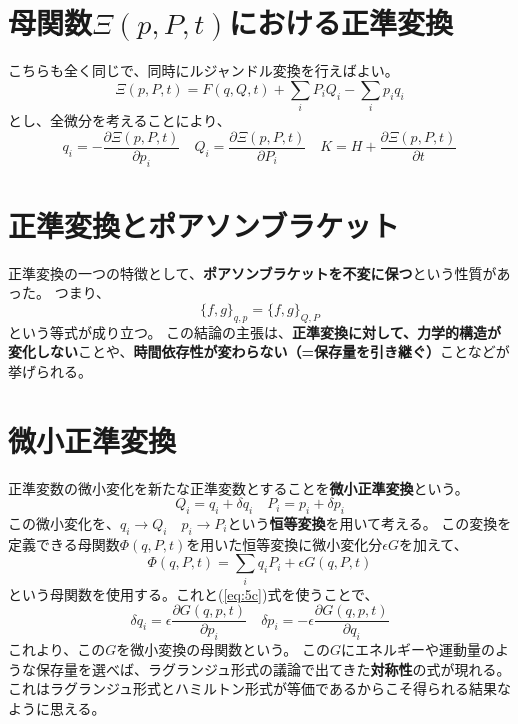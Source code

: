 \documentclass[a4paper]{jsreport}
\begin{document}
        \section{母関数$\Xi(p, P, t)$における正準変換}
            こちらも全く同じで、同時にルジャンドル変換を行えばよい。
            \begin{equation}
                \Xi(p, P, t) = F(q, Q, t) + \sum_{i} P_i Q_i - \sum_{i} p_i q_i
            \end{equation}
            とし、全微分を考えることにより、
            \begin{equation} \label{eq:5d}
                q_i = - \frac{\partial \Xi(p, P, t)}{\partial p_i} \quad Q_i = \frac{\partial \Xi(p, P, t)}{\partial P_i} \quad K = H + \frac{\partial \Xi(p, P, t)}{\partial t}
            \end{equation}
        
        \section{正準変換とポアソンブラケット}
            正準変換の一つの特徴として、\textbf{ポアソンブラケットを不変に保つ}という性質があった。
            つまり、
            \begin{equation}
                \{ f, g \}_{q, p} = \{ f, g \}_{Q, P}
            \end{equation}
            という等式が成り立つ。
            この結論の主張は、\textbf{正準変換に対して、力学的構造が変化しない}ことや、\textbf{時間依存性が変わらない（=保存量を引き継ぐ）}ことなどが挙げられる。

        \section{微小正準変換}
            正準変数の微小変化を新たな正準変数とすることを\textbf{微小正準変換}という。
            \begin{equation}
                Q_i = q_i + \delta q_i \quad P_i = p_i + \delta p_i
            \end{equation} 
            この微小変化を、$q_i \to Q_i \quad p_i \to P_i$という\textbf{恒等変換}を用いて考える。
            この変換を定義できる母関数$\Phi (q, P, t)$を用いた恒等変換に微小変化分$\epsilon G$を加えて、
            \begin{equation}
                \Phi (q, P, t) = \sum_{i} q_iP_i + \epsilon G(q, P, t)
            \end{equation}
            という母関数を使用する。これと(\ref{eq:5c})式を使うことで、
            \begin{equation}
                \delta q_i = \epsilon \frac{\partial G(q, p, t)}{\partial p_i} \quad \delta p_i = - \epsilon \frac{\partial G(q, p, t)}{\partial q_i}
            \end{equation}
            これより、この$G$を微小変換の母関数という。
            この$G$にエネルギーや運動量のような保存量を選べば、ラグランジュ形式の議論で出てきた\textbf{対称性}の式が現れる。
            これはラグランジュ形式とハミルトン形式が等価であるからこそ得られる結果なように思える。
\end{document}

